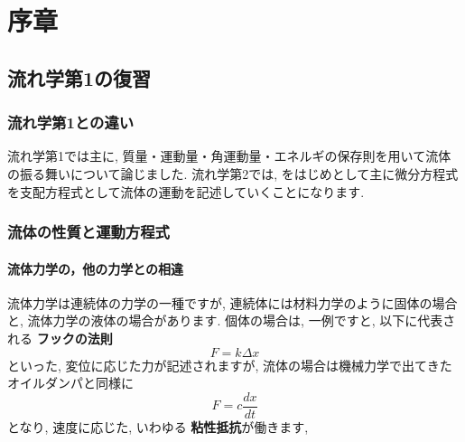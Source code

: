 \documentclass[uplatex,12pt]{jsbook}
\newcommand{\strong}[1]{{\textbf{\color{violet} #1}}}
\begin{document}
	\chapter{序章}
	\section{流れ学第1の復習}
	\subsection{流れ学第1との違い}
	流れ学第1では主に, 質量・運動量・角運動量・エネルギの保存則を用いて流体の振る舞いについて論じました. 流れ学第2では, \NS{}をはじめとして主に微分方程式を支配方程式として流体の運動を記述していくことになります.
	
	\subsection{流体の性質と運動方程式}
	\subsubsection{流体力学の，他の力学との相違}
	流体力学は連続体の力学の一種ですが, 連続体には材料力学のように固体の場合と, 流体力学の液体の場合があります. 個体の場合は, 一例ですと, 以下に代表される\strong{フックの法則}
	\begin{equation}
		F = k\Delta x
	\end{equation}
	といった, 変位に応じた力が記述されますが, 流体の場合は機械力学で出てきたオイルダンパと同様に
	\begin{equation}
		F = c \frac{dx}{dt}
	\end{equation}
	となり, 速度に応じた, いわゆる\strong{粘性抵抗}が働きます, 
	
\end{document}
